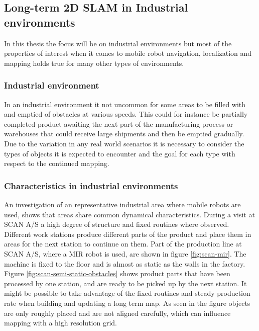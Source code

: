 \subsection{Long-term 2D SLAM in Industrial environments}
In this thesis the focus will be on industrial environments but most of the properties of interest when it comes to mobile robot navigation, localization and mapping holds true for many other types of environments.

\subsubsection{Industrial environment}
In an industrial environment it not uncommon for some areas to be filled with and emptied of obstacles at various speeds. This could for instance be partially completed product awaiting the next part of the manufacturing process or warehouses that could receive large shipments and then be emptied gradually. Due to the variation in any real world scenarios it is necessary to consider the types of objects it is expected to encounter and the goal for each type with respect to the continued mapping.

 
\subsubsection{Characteristics in industrial environments}
\label{sec:characteristics_in_industrial_environments}
An investigation of an representative industrial area where mobile robots are used, shows that areas share common dynamical characteristics. 
During a visit at SCAN A/S a high degree of structure and fixed routines where observed. 
Different work stations produce different parts of the product and place them in areas for the next station to continue on them.
Part of the production line at SCAN A/S, where a MIR robot is used, are shown in figure \ref{fig:scan-mir}. 
The machine is fixed to the floor and is almost as static as the walls in the factory.
Figure \ref{fig:scan-semi-static-obstacles} shows product parts that have been processed by one station, and are ready to be picked up by the next station. 
It might be possible to take advantage of the fixed routines and steady production rate when building and updating a long term map.
As seen in the figure objects are only roughly placed and are not aligned carefully, which can influence mapping with a high resolution grid.

